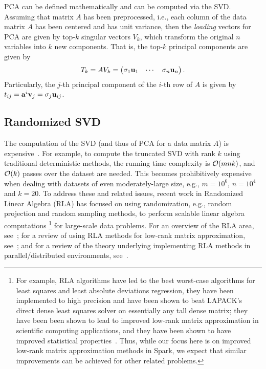 PCA can be defined mathematically and can be computed via the SVD.
Assuming that matrix $A$ has been preprocessed, i.e., each column of the data matrix $A$ has been centered and has unit variance, then the {\it loading} vectors for PCA are given by top-$k$ singular vectors $V_k$, which transform the original $n$ variables into $k$ new components. 
That is, the top-$k$ principal components are given by 
\begin{equation}
  T_k = A V_k = \begin{pmatrix} \sigma_1 \mathbf{u}_1 & \cdots & \sigma_n \mathbf{u}_n \end{pmatrix}.
\end{equation}
Particularly, the $j$-th principal component of the $i$-th row of $A$ is given by 
$t_{ij} = \mathbf{a}^i \mathbf{v}_j = \sigma_j \mathbf{u}_{ij}$.


\subsection{Randomized SVD}

The computation of the SVD (and thus of PCA for a data matrix $A$) is expensive~\cite{GVL96}.
For example, to compute the truncated SVD with rank $k$ using traditional deterministic methods, the running time complexity is $\operatorname{\mathcal{O}}(mnk)$, and $\operatorname{\mathcal{O}}(k)$ passes over the dataset are needed.
This  becomes prohibitively expensive when dealing with datasets of even moderately-large size, e.g., $m = 10^6$, $n = 10^4$ and $k = 20$. 
To address these and related issues, recent work in Randomized Linear Algebra (RLA) has focused on using randomization, e.g., random projection and random sampling methods, to perform scalable linear algebra computations%
\footnote{For example, RLA algorithms have led to the best worst-case algorithms for least squares and least absolute deviations regression, they have been implemented to high precision and have been shown to beat LAPACK's direct dense least squares solver on essentially any tall dense matrix; they have been been shown to lead to improved low-rank matrix approximation in scientific computing applications, and they have been shown to have improved statistical properties~\cite{Mah-mat-rev_BOOK}.  Thus, while our focus here is on improved low-rank matrix approximation methods in Spark, we expect that similar improvements can be achieved for other related problems.} for large-scale data problems.
For an overview of the RLA area, see~\cite{Mah-mat-rev_BOOK}; for a review of using RLA methods for low-rank matrix approximation, see~\cite{HMT09_SIREV}; and for a review of the theory underlying implementing RLA methods in parallel/distributed environments, see~\cite{YMM15_TR}.

